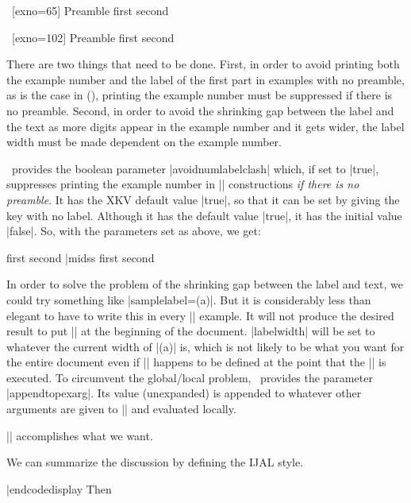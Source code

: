 \pex~[exno=65]
Preamble
\a first
\a second
\xe

\pex~[exno=102]
Preamble
\a first
\a second
\xe

There are two things that need to be done.  First, in order to
avoid printing both the example number and the label of the first
part in examples with no preamble, as is the case in
(), printing the example number must be suppressed
if there is no preamble. Second, in order to avoid the shrinking
gap between the label and the text as more digits appear in the
example number and it gets wider, the label width must be made
dependent on the example number.

\ExPex\ provides the boolean parameter |avoidnumlabelclash|
which, if set to |true|, suppresses printing the example number
in |\pex| constructions {\it if there is no preamble}.  It has
the XKV default value |true|, so that it can be set by giving the
key with no label.  Although it has the default value |true|, it
has the initial value |false|.  So, with the parameters set as
above, we get:

\beginss
\pex[exno=5,avoidnumlabelclash]
\a first
\a second
\xe|midss
\pex[exno=5,avoidnumlabelclash]
\a first
\a second
\xe
\endss

In order to solve the problem of the shrinking gap between the
label and text, we could try something like
|samplelabel=(\actualexno a)|. But it is considerably less than
elegant to have to write this in every |\pex| example.  It will
not produce the desired result to put
|| at the beginning of the
document.  |labelwidth| will be set to whatever the current width
of |(\actualexno a)| is, which is not likely to be what you want
for the entire document even if |\actualexno| happens to be
defined at the point that the |\lingset| is
executed.  To circumvent the global/local problem, \ExPex\
provides the parameter |appendtopexarg|.  Its value (unexpanded)
is appended to whatever other arguments are given to
|\pex| and evaluated locally.

\exfrag
||
\xe
accomplishes what we want.

We can summarize the discussion by defining the IJAL style.

\codedisplay
{}
|endcodedisplay
Then

